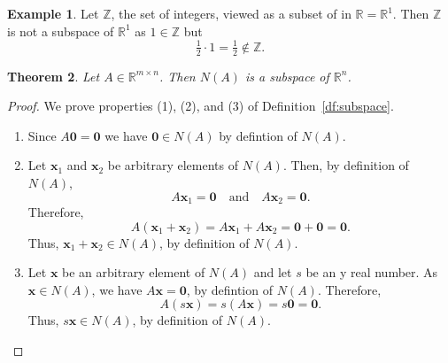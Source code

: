 \documentclass[12pt]{amsart}
\newcommand{\RR}{\mathbb{R}}
\newcommand{\ZZ}{\mathbb{Z}}
\newtheorem{theorem}{Theorem}[section]
\theoremstyle{definition} \newtheorem{definition}[theorem]{Definition}
\newtheorem{example}[theorem]{Example}
\newcommand{\bx}{\mathbf{x}}
\newcommand{\bzero}{\mathbf{0}}
\begin{document}
\begin{example}
  Let $\ZZ$, the set of integers, viewed as a subset of in $\RR=\RR^1$.
  Then $\ZZ$ is not a subspace of $\RR^1$ as $1\in \ZZ$ but
  \[
    \tfrac12\cdot 1 = \tfrac12\notin \ZZ.
  \]
\end{example}

\begin{theorem}\label{th:nullspace_is_subspace}
  Let $A\in\RR^{m\times n}$. Then $N(A)$ is a subspace of $\RR^n$.
\end{theorem}

\begin{proof} We prove properties (1), (2), and (3) of Definition~\ref{df:subspace}.
  \begin{enumerate}
    \item Since $A\bzero=\bzero$ we have $\bzero\in N(A)$ by defintion of $N(A)$.
    \item Let $\bx_1$ and $\bx_2$ be arbitrary elements of $N(A)$. Then, by definition of $N(A)$,
      \[
        A\bx_1=\bzero\quad\text{and}\quad A\bx_2=\bzero.
      \]
      Therefore,
      \[
        A(\bx_1+\bx_2) = A\bx_1 + A\bx_2 = \bzero + \bzero = \bzero.
      \]
      Thus, $\bx_1+\bx_2\in N(A)$, by definition of $N(A)$.
    \item Let $\bx$ be an arbitrary element of $N(A)$ and let $s$ be an y real number.
      As $\bx\in N(A)$, we have $A\bx=\bzero$, by defintion of $N(A)$.
      Therefore,
      \[
        A(s\bx) = s(A\bx) = s\bzero = \bzero.
      \]
      Thus, $s\bx\in N(A)$, by definition of $N(A)$.\qedhere
  \end{enumerate}
\end{proof}
\end{document}
